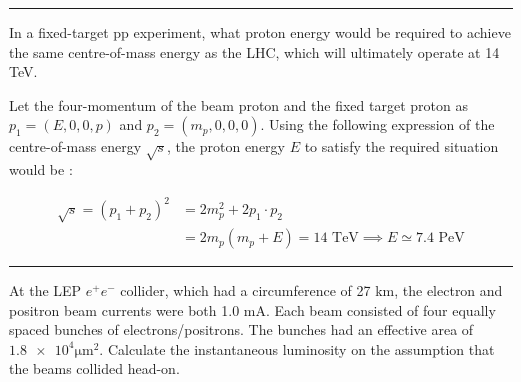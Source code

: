 \noindent\rule{7in}{1.5pt}


\begin{problem}{1.10}
In a fixed-target pp experiment, what proton energy would be required to achieve the same centre-of-mass energy as the LHC, which will ultimately operate at 14 TeV.
\end{problem}
\begin{solution}
Let the four-momentum of the beam proton and the fixed target proton as $p_1 = (E,0,0,p)$ and $p_2 = (m_p,0,0,0)$. Using the following expression of the centre-of-mass energy $\sqrt{s}$, the proton energy $E$ to satisfy the required situation would be :

\begin{align*}
    \sqrt{s} = (p_1 + p_2) ^2 &= 2m_p^2 + 2 p_1 \cdot p_2 \\[0.15in]
                              &= 2m_p \left( m_p + E \right) = 14 \text{ TeV} \implies \boxed{E \simeq 7.4 \text{ PeV}}
\end{align*}
\end{solution} 

\noindent\rule{7in}{1.5pt}
    

\begin{problem}{1.11}
At the LEP $e^+e^-$ collider, which had a circumference of 27 km, the electron and positron beam currents were both 1.0 mA. Each beam consisted of four equally spaced bunches of electrons/positrons. The bunches had an effective area of $\num{1.8e4}\unit{\micro\metre^2}$.
Calculate the instantaneous luminosity on the assumption that the beams collided head-on.
\end{problem}
\begin{solution}

\end{solution}